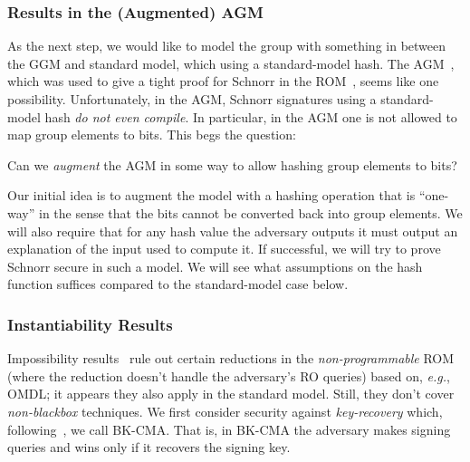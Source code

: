  \subsubsection{Results in the (Augmented) AGM} 
 As the next step, we would like to model the group with something in between the GGM  and standard model, which using a standard-model hash.  The AGM~\cite{C:FucKilLos18}, which was used to give a tight proof for Schnorr in the ROM~\cite{EC:FucPloSeu20},  seems like one possibility.  Unfortunately, in  the AGM,  Schnorr signatures using a standard-model hash \emph{do not  even compile}. In particular, in the AGM one is not allowed to map group elements to bits.  This begs the question: 
\begin{ques}
    Can we \emph{augment} the AGM in some way to allow hashing group elements to bits?
\end{ques}
Our initial idea is to augment the model  with a hashing operation  that is  ``one-way'' in the sense that  the bits cannot be converted back into group elements.  We will also require that   for any  hash value the adversary  outputs it must output an explanation of the input used to  compute it.  If successful, we will try to prove Schnorr secure in such a model.  We will see what assumptions on the hash function suffices compared to the standard-model case below. 

\fi

\subsubsection{Instantiability Results} \label{sec-inst}


Impossibility results~\cite[Tables 1 and 2]{FukumitsuH21} rule out certain reductions  in the \emph{non-programmable} ROM (where the reduction doesn't handle the adversary's RO queries) based on, \emph{e.g.}, OMDL; it appears they  also apply in the standard model.  Still, they don't cover \emph{non-blackbox} techniques. %
We first consider security against \emph{key-recovery} which, following~\cite{AC:PaiVer05}, we call BK-CMA. That is, in BK-CMA the adversary makes signing queries and wins only if it recovers the signing key.  %

